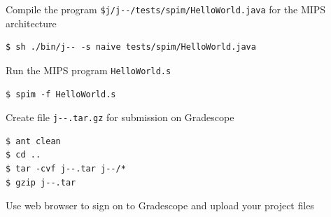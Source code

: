 \documentclass[8pt,a4paper,compress]{beamer}
\newlength{\myMheight}
\begin{document}
\begin{frame}[fragile]
\pause

Compile the \jmm program \lstinline{$j/j--/tests/spim/HelloWorld.java} for the MIPS architecture

\begin{tcolorbox}[enhanced,drop shadow southwest,sharp corners,size=fbox,colback=black]
\begin{lstlisting}[style=terminal]
$ sh ./bin/j-- -s naive tests/spim/HelloWorld.java
\end{lstlisting}
\end{tcolorbox}

\pause\bigskip

Run the MIPS program \lstinline{HelloWorld.s}

\begin{tcolorbox}[enhanced,drop shadow southwest,sharp corners,size=fbox,colback=black]
\begin{lstlisting}[style=terminal]
$ spim -f HelloWorld.s
\end{lstlisting}
\end{tcolorbox}

\pause\bigskip

Create file \lstinline{j--.tar.gz} for submission on Gradescope

\begin{tcolorbox}[enhanced,drop shadow southwest,sharp corners,size=fbox,colback=black]
\begin{lstlisting}[style=terminal]
$ ant clean
$ cd ..
$ tar -cvf j--.tar j--/*
$ gzip j--.tar
\end{lstlisting}
\end{tcolorbox}

\pause\bigskip

Use web browser  to sign on to Gradescope and upload your project files
\end{frame}
\end{document}
